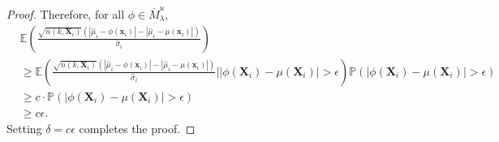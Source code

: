 \documentclass[12pt]{article}
\newcommand{\des}{\ensuremath{\bm{x}}}
\newcommand{\desCap}{\ensuremath{\bm{X}}}
\begin{document}
\begin{proof}
    Therefore, for all $\phi \in \overline{M}_\lambda^u$,
    \begin{equation*}
        \begin{split}
            &\mathbb{E}\left ( \frac{\sqrt{n(k,\desCap_i)}(|\hat{\mu}_i-\phi(\des_i)|-|\hat{\mu}_i-\mu(\des_i)|)}{\hat{\sigma}_i} \right )\\
            & \geq \mathbb{E}\left ( \frac{\sqrt{n(k,\desCap_i)}(|\hat{\mu}_i-\phi(\des_i)|-|\hat{\mu}_i-\mu(\des_i)|)}{\hat{\sigma}_i} \Big \vert |\phi(\desCap_i)-\mu(\desCap_i)|>\epsilon \right )\mathbb{P}\left (|\phi(\desCap_i)-\mu(\desCap_i)|>\epsilon \right ) \\
            & \geq c\cdot \mathbb{P}\left (|\phi(\desCap_i)-\mu(\desCap_i)|>\epsilon \right )\\
            & \geq c \epsilon.
        \end{split}
    \end{equation*}
    Setting $\delta=c\epsilon$ completes the proof. 
\end{proof}
\end{document}
